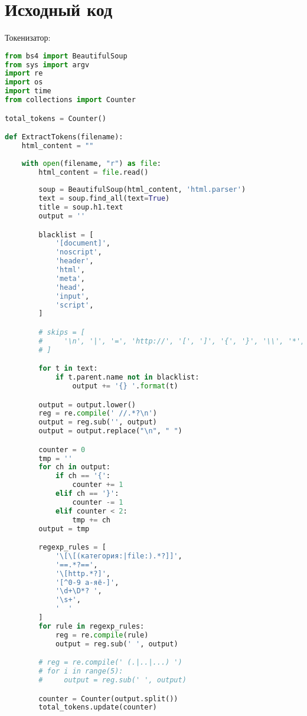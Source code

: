 \section{Исходный код}
Токенизатор:
\begin{lstlisting}[language=Python]
from bs4 import BeautifulSoup
from sys import argv
import re
import os
import time
from collections import Counter

total_tokens = Counter()

def ExtractTokens(filename):
    html_content = ""
    
    with open(filename, "r") as file:
        html_content = file.read()
        
        soup = BeautifulSoup(html_content, 'html.parser')
        text = soup.find_all(text=True)
        title = soup.h1.text
        output = ''

        blacklist = [
            '[document]',
            'noscript',
            'header',
            'html',
            'meta',
            'head', 
            'input',
            'script',
        ]

        # skips = [
        #     '\n', '|', '=', 'http://', '[', ']', '{', '}', '\\', '*', '_', '/', '.', ','
        # ]

        for t in text:
            if t.parent.name not in blacklist:
                output += '{} '.format(t)

        output = output.lower()
        reg = re.compile(' //.*?\n')
        output = reg.sub('', output)
        output = output.replace("\n", " ")

        counter = 0
        tmp = ''
        for ch in output:
            if ch == '{':
                counter += 1
            elif ch == '}':
                counter -= 1
            elif counter < 2:
                tmp += ch
        output = tmp

        regexp_rules = [
            '\[\[(категория:|file:).*?]]',
            '==.*?==',
            '\[http.*?]',
            '[^0-9 а-яё-]',
            '\d+\D*? ',
            '\s+',
            '  '
        ]
        for rule in regexp_rules:
            reg = re.compile(rule)
            output = reg.sub(' ', output)

        # reg = re.compile(' (.|..|...) ')
        # for i in range(5):
        #     output = reg.sub(' ', output)

        counter = Counter(output.split())
        total_tokens.update(counter)


\end{lstlisting}
